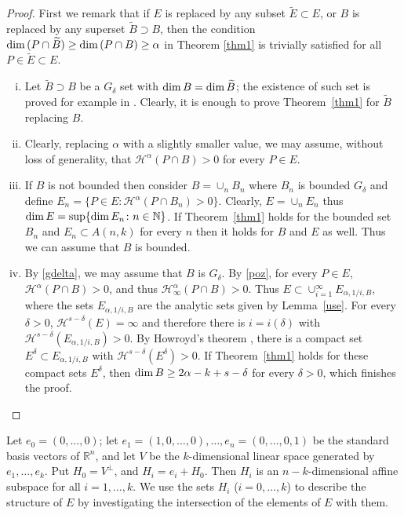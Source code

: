 \documentclass[a4paper]{amsart}
\theoremstyle{definition} \newtheorem{remark}[theorem]{Remark}
\def\rr{{\mathbb R}}
\def\su{\subset}
\def\sp{\supset}
\def\al{\alpha}
\def\de{\delta}
\def\ti{\widetilde}
\def\dim{{\rm dim}\, }
\def\hau{\mathcal{H}}
\begin{document}
\begin{proof} 

First we remark that if $E$ is replaced by any subset $\ti{E} \su E$, or $B$ is replaced by any superset $\ti{B} \supset B$, 
then the condition $\dim (P \cap \ti{B} ) \geq \dim (P \cap B ) \geq \al$ in Theorem \ref{thm1} is trivially satisfied for all $P \in \ti{E} \su E$. 

\begin{enumerate}[(i)]

\item
Let $\ti{B} \sp B$ be a $G_{\de}$ set with $\dim B= \dim \ti{B}$; the existence of such set is proved for example in \cite{Fr}. 
Clearly, it is enough to prove Theorem~\ref{thm1} for $\ti{B}$ replacing $B$.

\item
Clearly, replacing $\alpha$ with a slightly smaller value, we may assume, without loss of generality, that $\hau^{\alpha}(P\cap B)>0$ for every $P\in E$.

\item
If $B$ is not bounded then consider $B = \cup_n B_n$ where $B_n$ is bounded $G_{\de}$ and define $E_n=\{P \in E \colon \hau^{\alpha}(P\cap B_n)>0 \}$. 
Clearly, $E=\cup_n E_n$ thus $ \dim E=\sup\{ \dim E_n \colon n \in \mathbb{N}\}$. 
If Theorem~\ref{thm1} holds for the bounded set $B_n$ and $E_n \su A(n,k)$ for every $n$ then it holds for $B$ and $E$ as well. 
Thus we can assume that $B$ is bounded. 

\item
By \eqref{gdelta}, we may assume that $B$ is $G_\delta$.
By \eqref{poz}, for every $P\in E$, $\hau^\alpha(P\cap B)>0$, and thus $\hau^\alpha_\infty(P\cap B)>0$.
Thus $E\su \cup_{i=1}^\infty E_{\al,1/i,B}$, where the sets
$E_{\al,1/i,B}$ are the analytic sets given by Lemma~\ref{use}.
For every $\delta>0$, $\hau^{s-\delta}(E)=\infty$ and therefore
there is $i=i(\delta)$ with $\hau^{s-\delta}(E_{\al,1/i,B})>0$.
By Howroyd's theorem \cite{Ho}, there is a compact set
$E^\delta\subset E_{\al,1/i,B}$ with $\hau^{s-\delta} (E^\delta)>0$.
If Theorem~\ref{thm1} holds for these compact sets $E^\delta$, then
$\dim B \geq 2 \al - k+s-\delta$ for every $\delta>0$, which finishes the proof.
\end{enumerate}
\end{proof}



Let $e_0=(0,\dots,0)$; let $e_1=(1,0,\dots,0), \dots, e_n=(0,\dots,0,1)$ be the standard basis vectors of $\rr^n$, and 
let $V$ be the $k$-dimensional linear space generated by $e_1, \dots, e_k$. Put $H_0=V^{\bot}$, and  
$H_i=e_i + H_0$. Then $H_i$ is an $n-k$-dimensional affine subspace for all $i=1,\dots,k$. 
We use the sets $H_i$ ($i=0,\dots,k$) to describe the structure of $E$ by investigating the intersection of the elements of $E$ with them.
\end{document}
